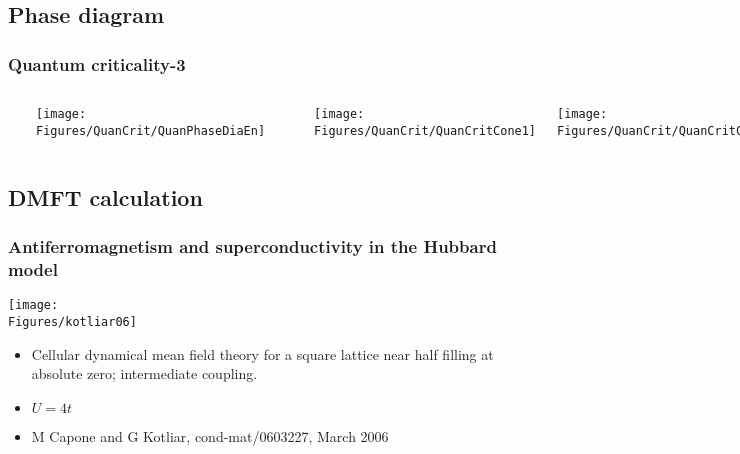 \subsection{Phase diagram}
\begin{frame}[label=quancrit3]
\frametitle{Quantum criticality-3}
\begin{columns}[t]
\centerline{~}
\texttt{[image: \\Figures/QuanCrit/QuanPhaseDiaEn]}

\centerline{~}
\centerline{\texttt{[image: \\Figures/QuanCrit/QuanCritCone1]}}

\centerline{\texttt{[image: \\Figures/QuanCrit/QuanCritCone2]}}

\end{columns}

\end{frame}
 
\subsection{DMFT calculation}
\begin{frame}[label=DMFT]
\frametitle{Antiferromagnetism and superconductivity in the Hubbard model}

\vspace{-6ex}
\centerline{\texttt{[image: \\Figures/kotliar06]}}

\vspace{-12ex}
\begin{itemize}
\item
Cellular dynamical mean field theory for a square lattice near half
filling at absolute zero; intermediate coupling.
\item
$U=4t$
\item
M Capone and G Kotliar, cond-mat/0603227, March 2006
\end{itemize}

\end{frame}



